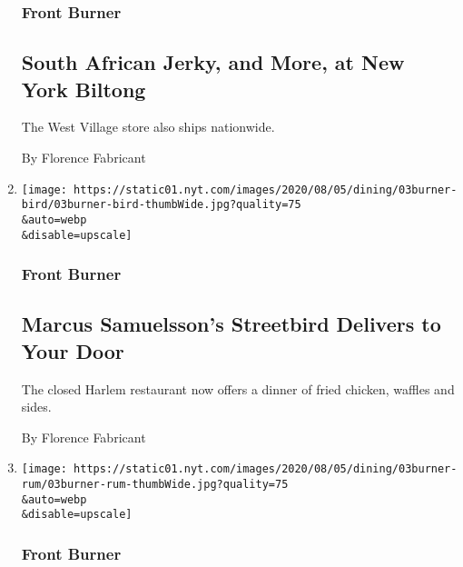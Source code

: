 \begin{enumerate}
  \hypertarget{front-burner-3}{%
  \subsubsection{Front Burner}\label{front-burner-3}}

  \hypertarget{south-african-jerky-and-more-at-new-york-biltong}{%
  \subsection{South African Jerky, and More, at New York
  Biltong}\label{south-african-jerky-and-more-at-new-york-biltong}}

  The West Village store also ships nationwide.

  By Florence Fabricant
\item
  \href{/2020/08/03/dining/marcus-samuelsson-fried-chicken-delivery.html}{}

  \texttt{[image: https://static01.nyt.com/images/2020/08/05/dining/03burner-bird/03burner-bird-thumbWide.jpg?quality=75\\\&auto=webp\\\&disable=upscale]}

  \hypertarget{front-burner-4}{%
  \subsubsection{Front Burner}\label{front-burner-4}}

  \hypertarget{marcus-samuelssons-streetbird-delivers-to-your-door}{%
  \subsection{Marcus Samuelsson's Streetbird Delivers to Your
  Door}\label{marcus-samuelssons-streetbird-delivers-to-your-door}}

  The closed Harlem restaurant now offers a dinner of fried chicken,
  waffles and sides.

  By Florence Fabricant
\item
  \href{/2020/08/03/dining/drinks/santa-teresa-rum.html}{}

  \texttt{[image: https://static01.nyt.com/images/2020/08/05/dining/03burner-rum/03burner-rum-thumbWide.jpg?quality=75\\\&auto=webp\\\&disable=upscale]}

  \hypertarget{front-burner-5}{%
  \subsubsection{Front Burner}\label{front-burner-5}}


\end{enumerate}
